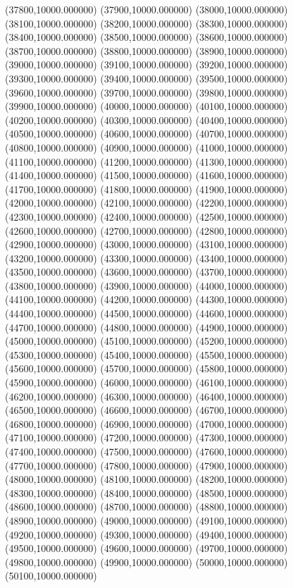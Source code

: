 (37800,10000.000000)
(37900,10000.000000)
(38000,10000.000000)
(38100,10000.000000)
(38200,10000.000000)
(38300,10000.000000)
(38400,10000.000000)
(38500,10000.000000)
(38600,10000.000000)
(38700,10000.000000)
(38800,10000.000000)
(38900,10000.000000)
(39000,10000.000000)
(39100,10000.000000)
(39200,10000.000000)
(39300,10000.000000)
(39400,10000.000000)
(39500,10000.000000)
(39600,10000.000000)
(39700,10000.000000)
(39800,10000.000000)
(39900,10000.000000)
(40000,10000.000000)
(40100,10000.000000)
(40200,10000.000000)
(40300,10000.000000)
(40400,10000.000000)
(40500,10000.000000)
(40600,10000.000000)
(40700,10000.000000)
(40800,10000.000000)
(40900,10000.000000)
(41000,10000.000000)
(41100,10000.000000)
(41200,10000.000000)
(41300,10000.000000)
(41400,10000.000000)
(41500,10000.000000)
(41600,10000.000000)
(41700,10000.000000)
(41800,10000.000000)
(41900,10000.000000)
(42000,10000.000000)
(42100,10000.000000)
(42200,10000.000000)
(42300,10000.000000)
(42400,10000.000000)
(42500,10000.000000)
(42600,10000.000000)
(42700,10000.000000)
(42800,10000.000000)
(42900,10000.000000)
(43000,10000.000000)
(43100,10000.000000)
(43200,10000.000000)
(43300,10000.000000)
(43400,10000.000000)
(43500,10000.000000)
(43600,10000.000000)
(43700,10000.000000)
(43800,10000.000000)
(43900,10000.000000)
(44000,10000.000000)
(44100,10000.000000)
(44200,10000.000000)
(44300,10000.000000)
(44400,10000.000000)
(44500,10000.000000)
(44600,10000.000000)
(44700,10000.000000)
(44800,10000.000000)
(44900,10000.000000)
(45000,10000.000000)
(45100,10000.000000)
(45200,10000.000000)
(45300,10000.000000)
(45400,10000.000000)
(45500,10000.000000)
(45600,10000.000000)
(45700,10000.000000)
(45800,10000.000000)
(45900,10000.000000)
(46000,10000.000000)
(46100,10000.000000)
(46200,10000.000000)
(46300,10000.000000)
(46400,10000.000000)
(46500,10000.000000)
(46600,10000.000000)
(46700,10000.000000)
(46800,10000.000000)
(46900,10000.000000)
(47000,10000.000000)
(47100,10000.000000)
(47200,10000.000000)
(47300,10000.000000)
(47400,10000.000000)
(47500,10000.000000)
(47600,10000.000000)
(47700,10000.000000)
(47800,10000.000000)
(47900,10000.000000)
(48000,10000.000000)
(48100,10000.000000)
(48200,10000.000000)
(48300,10000.000000)
(48400,10000.000000)
(48500,10000.000000)
(48600,10000.000000)
(48700,10000.000000)
(48800,10000.000000)
(48900,10000.000000)
(49000,10000.000000)
(49100,10000.000000)
(49200,10000.000000)
(49300,10000.000000)
(49400,10000.000000)
(49500,10000.000000)
(49600,10000.000000)
(49700,10000.000000)
(49800,10000.000000)
(49900,10000.000000)
(50000,10000.000000)
(50100,10000.000000)
